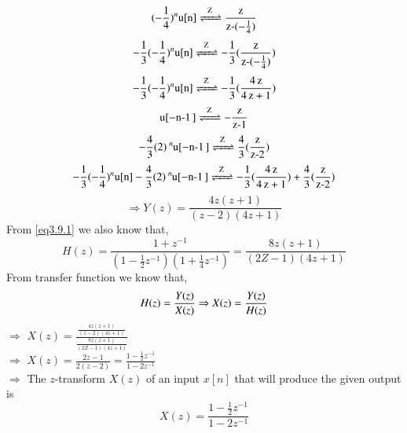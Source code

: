 \documentclass[journal,12pt,twocolumn]{IEEEtran}
\begin{document}
\begin{equation}
\ce{(-\frac{1}{4})^{n}u[n] <=>[Z] \frac{z}{z-(-\frac{1}{4})}}\\
\end{equation}
\begin{equation}
\ce{-\frac{1}{3}(-\frac{1}{4})^{n}u[n] <=>[Z] -\frac{1}{3}(\frac{z}{z-(-\frac{1}{4})})}\\
\end{equation}
\begin{equation}
\ce{-\frac{1}{3}(-\frac{1}{4})^{n}u[n] <=>[Z] -\frac{1}{3}(\frac{4z}{4z + 1})}\\
\end{equation}
\begin{equation}
\ce{u[-n-1] <=>[Z] -\frac{z}{z-1}}\\
\end{equation}
\begin{equation}
\ce{-\frac{4}{3}(2)^{n}u[-n-1] <=>[Z] \frac{4}{3}(\frac{z}{z-2})}\\
\end{equation}
\begin{equation}
\ce{-\frac{1}{3}(-\frac{1}{4})^{n}u[n] - \frac{4}{3}(2)^{n}u[-n-1] <=>[Z] -\frac{1}{3}(\frac{4z}{4z + 1}) + \frac{4}{3}(\frac{z}{z-2})}
\end{equation}
\newpage
\begin{equation}
\Rightarrow Y(z)= \frac{4z(z+1)}{(z-2)(4z+1)} \label{eq3.9.3}
\end{equation}
 From \eqref{eq3.9.1} we also know that,\\
\begin{equation}
H(z)=\frac{1+z^{-1}}{(1- \frac{1}{2}z^{-1})(1+\frac{1}{4}z^{-1})} = \frac{8z(z+1)}{(2Z-1)(4z+1)}
\end{equation}
From transfer function we know that,\\
\begin{equation}
H(z)=\frac{Y(z)}{X(z)}\\
\Rightarrow X(z) = \frac{Y(z)}{H(z)}
\end{equation}
$\Rightarrow$ $X(z)= \frac{\frac{4z(z+1)}{(z-2)(4z+1)}}{\frac{8z(z+1)}{(2Z-1)(4z+1)}}$\\
$\Rightarrow$ $X(z) = \frac{2z-1}{2(z-2)}=\frac{1-\frac{1}{2}z^{-1}}{1-2z^{-1}}$ \label{eq3.9.4}\\

$\Rightarrow$ The $z$-transform $X(z)$ of an input $x[n]$ that will produce the given output is\\
\begin{equation}
X(z) = \frac{1-\frac{1}{2}z^{-1}}{1-2z^{-1}} \label{eq3.9.5}
\end{equation}
\end{document}
